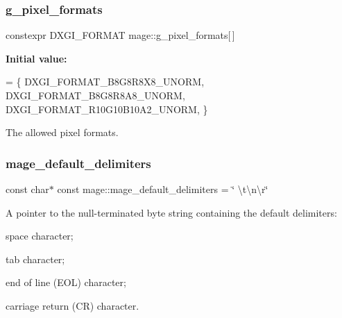 \subsubsection{\texorpdfstring{g\+\_\+pixel\+\_\+formats}{g\_pixel\_formats}}
{\footnotesize\ttfamily constexpr D\+X\+G\+I\+\_\+\+F\+O\+R\+M\+AT mage\+::g\+\_\+pixel\+\_\+formats\mbox{[}$\,$\mbox{]}}

{\bfseries Initial value\+:}
\begin{DoxyCode}
= \{
        DXGI\_FORMAT\_B8G8R8X8\_UNORM,    
        DXGI\_FORMAT\_B8G8R8A8\_UNORM,    
        DXGI\_FORMAT\_R10G10B10A2\_UNORM, 
    \}
\end{DoxyCode}
The allowed pixel formats. \hypertarget{namespacemage_ae247ad66af37a4b0d67ddca9404ca01a}{}\label{namespacemage_ae247ad66af37a4b0d67ddca9404ca01a} 
\subsubsection{\texorpdfstring{mage\+\_\+default\+\_\+delimiters}{mage\_default\_delimiters}}
{\footnotesize\ttfamily const char$\ast$ const mage\+::mage\+\_\+default\+\_\+delimiters = \char`\"{} \textbackslash{}t\textbackslash{}n\textbackslash{}r\char`\"{}}

A pointer to the null-\/terminated byte string containing the default delimiters\+:
\begin{DoxyEnumerate}
\item space character;
\item tab character;
\item end of line (E\+OL) character;
\item carriage return (CR) character. 
\end{DoxyEnumerate}